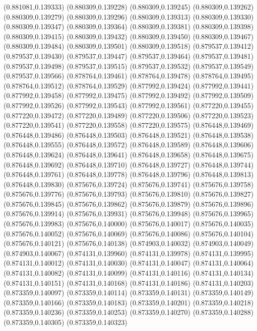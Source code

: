 (0.881081,0.139333)
(0.880309,0.139228)
(0.880309,0.139245)
(0.880309,0.139262)
(0.880309,0.139279)
(0.880309,0.139296)
(0.880309,0.139313)
(0.880309,0.139330)
(0.880309,0.139347)
(0.880309,0.139364)
(0.880309,0.139381)
(0.880309,0.139398)
(0.880309,0.139415)
(0.880309,0.139432)
(0.880309,0.139450)
(0.880309,0.139467)
(0.880309,0.139484)
(0.880309,0.139501)
(0.880309,0.139518)
(0.879537,0.139412)
(0.879537,0.139430)
(0.879537,0.139447)
(0.879537,0.139464)
(0.879537,0.139481)
(0.879537,0.139498)
(0.879537,0.139515)
(0.879537,0.139532)
(0.879537,0.139549)
(0.879537,0.139566)
(0.878764,0.139461)
(0.878764,0.139478)
(0.878764,0.139495)
(0.878764,0.139512)
(0.878764,0.139529)
(0.877992,0.139424)
(0.877992,0.139441)
(0.877992,0.139458)
(0.877992,0.139475)
(0.877992,0.139492)
(0.877992,0.139509)
(0.877992,0.139526)
(0.877992,0.139543)
(0.877992,0.139561)
(0.877220,0.139455)
(0.877220,0.139472)
(0.877220,0.139489)
(0.877220,0.139506)
(0.877220,0.139523)
(0.877220,0.139541)
(0.877220,0.139558)
(0.877220,0.139575)
(0.876448,0.139469)
(0.876448,0.139486)
(0.876448,0.139503)
(0.876448,0.139521)
(0.876448,0.139538)
(0.876448,0.139555)
(0.876448,0.139572)
(0.876448,0.139589)
(0.876448,0.139606)
(0.876448,0.139624)
(0.876448,0.139641)
(0.876448,0.139658)
(0.876448,0.139675)
(0.876448,0.139692)
(0.876448,0.139710)
(0.876448,0.139727)
(0.876448,0.139744)
(0.876448,0.139761)
(0.876448,0.139778)
(0.876448,0.139796)
(0.876448,0.139813)
(0.876448,0.139830)
(0.875676,0.139724)
(0.875676,0.139741)
(0.875676,0.139758)
(0.875676,0.139776)
(0.875676,0.139793)
(0.875676,0.139810)
(0.875676,0.139827)
(0.875676,0.139845)
(0.875676,0.139862)
(0.875676,0.139879)
(0.875676,0.139896)
(0.875676,0.139914)
(0.875676,0.139931)
(0.875676,0.139948)
(0.875676,0.139965)
(0.875676,0.139983)
(0.875676,0.140000)
(0.875676,0.140017)
(0.875676,0.140035)
(0.875676,0.140052)
(0.875676,0.140069)
(0.875676,0.140086)
(0.875676,0.140104)
(0.875676,0.140121)
(0.875676,0.140138)
(0.874903,0.140032)
(0.874903,0.140049)
(0.874903,0.140067)
(0.874131,0.139960)
(0.874131,0.139978)
(0.874131,0.139995)
(0.874131,0.140012)
(0.874131,0.140030)
(0.874131,0.140047)
(0.874131,0.140064)
(0.874131,0.140082)
(0.874131,0.140099)
(0.874131,0.140116)
(0.874131,0.140134)
(0.874131,0.140151)
(0.874131,0.140168)
(0.874131,0.140186)
(0.874131,0.140203)
(0.873359,0.140097)
(0.873359,0.140114)
(0.873359,0.140131)
(0.873359,0.140149)
(0.873359,0.140166)
(0.873359,0.140183)
(0.873359,0.140201)
(0.873359,0.140218)
(0.873359,0.140236)
(0.873359,0.140253)
(0.873359,0.140270)
(0.873359,0.140288)
(0.873359,0.140305)
(0.873359,0.140323)
